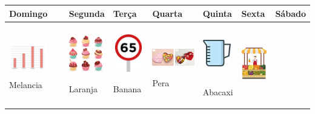 \begin{longtable}[]{@{}lllllll@{}}
\toprule
Domingo & Segunda & Terça & Quarta & Quinta & Sexta &
Sábado\tabularnewline
\midrule
\endhead
\begin{minipage}[t]{0.14\columnwidth}\raggedright\strut
\includegraphics[width=0.65929in,height=0.64094in]{media/image149.png}Melancia\strut
\end{minipage} & \begin{minipage}[t]{0.14\columnwidth}\raggedright\strut
\includegraphics[width=0.57512in,height=0.64094in]{media/image150.png}

Laranja\strut
\end{minipage} & \begin{minipage}[t]{0.14\columnwidth}\raggedright\strut
\includegraphics[width=0.59540in,height=0.64607in]{media/image151.png}

Banana\strut
\end{minipage} & \begin{minipage}[t]{0.14\columnwidth}\raggedright\strut
\includegraphics[width=0.75448in,height=0.58371in]{media/image152.png}Pera\strut
\end{minipage} & \begin{minipage}[t]{0.14\columnwidth}\raggedright\strut
\includegraphics[width=0.48354in,height=0.74826in]{media/image153.png}

Abacaxi\strut
\end{minipage} & \begin{minipage}[t]{0.14\columnwidth}\raggedright\strut
\includegraphics[width=0.48530in,height=0.73899in]{media/image154.png}


\end{minipage}
\end{longtable}
